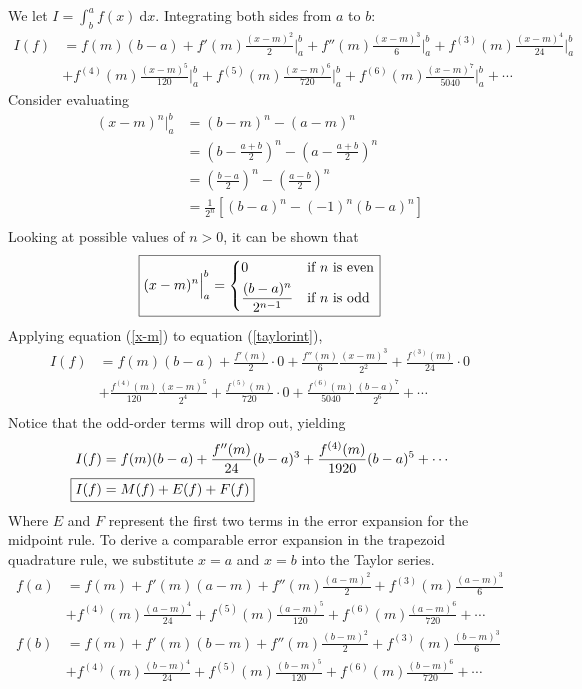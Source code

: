 We let $I = \int_b^a f(x)\:\mathrm{d}x$. Integrating both sides from $a$ to $b$:
\begin{align}\label{taylorint}
I(f) &= f(m)(b-a) + f'(m)\frac{(x-m)^2}{2}\Big|_a^b + f''(m)\frac{(x-m)^3}{6}\Big|_a^b + f^{(3)}(m)\frac{(x-m)^4}{24}\Big|_a^b\\
&+ f^{(4)}(m)\frac{(x-m)^5}{120}\Big|_a^b + f^{(5)}(m)\frac{(x-m)^6}{720}\Big|_a^b + f^{(6)}(m)\frac{(x-m)^7}{5040}\Big|_a^b + \cdots
\end{align}
Consider evaluating
\begin{align*}
(x-m)^n\Big|_a^b &= (b-m)^n - (a-m)^n\\
&= \left(b-\frac{a+b}{2}\right)^n - \left(a-\frac{a+b}{2}\right)^n\\
&= \left(\frac{b-a}{2}\right)^n - \left(\frac{a-b}{2}\right)^n\\
&= \frac{1}{2^n}\left[(b-a)^n-(-1)^n(b-a)^n\right]\\
\end{align*}
Looking at possible values of $n>0$, it can be shown that
\begin{equation}\label{x-m}
\boxed{
(x-m)^n\Big|_a^b = \begin{dcases}
0 &\text{if } n \text{ is even}\\
\frac{(b-a)^n}{2^{n-1}} &\text{if } n \text{ is odd}
\end{dcases}
}
\end{equation}
Applying equation (\ref{x-m}) to equation (\ref{taylorint}),
\begin{align*}
I(f) &= f(m)(b-a) + \frac{f'(m)}{2}\cdot 0 + \frac{f''(m)}{6} \frac{(x-m)^3}{2^2} + \frac{f^{(3)}(m)}{24}\cdot 0\\
&+ \frac{f^{(4)}(m)}{120} \frac{(x-m)^5}{2^4} + \frac{f^{(5)}(m)}{720}\cdot 0 + \frac{f^{(6)}(m)}{5040}\frac{(b-a)^7}{2^6} + \cdots\\
\end{align*}
Notice that the odd-order terms will drop out, yielding
\begin{align}\label{midpoint}
I(f) &= f(m)(b-a) + \frac{f''(m)}{24}(b-a)^3 + \frac{f^{(4)}(m)}{1920}(b-a)^5 + \cdots \\
\Aboxed{I(f) &= M(f) + E(f) + F(f)}
\end{align}
Where $E$ and $F$ represent the first two terms in the error expansion for the midpoint rule. To derive a comparable error expansion in the trapezoid quadrature rule, we substitute $x=a$ and $x=b$ into the Taylor series.
\begin{align*}
f(a) &= f(m) + f'(m)(a-m) + f''(m)\frac{(a-m)^2}{2} + f^{(3)}(m)\frac{(a-m)^3}{6}\\
&+ f^{(4)}(m)\frac{(a-m)^4}{24} + f^{(5)}(m)\frac{(a-m)^5}{120} + f^{(6)}(m)\frac{(a-m)^6}{720} + \cdots\\
f(b) &= f(m) + f'(m)(b-m) + f''(m)\frac{(b-m)^2}{2} + f^{(3)}(m)\frac{(b-m)^3}{6}\\
&+ f^{(4)}(m)\frac{(b-m)^4}{24} + f^{(5)}(m)\frac{(b-m)^5}{120} + f^{(6)}(m)\frac{(b-m)^6}{720} + \cdots\\
\end{align*}
